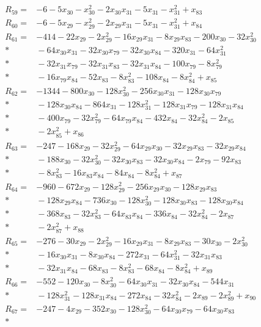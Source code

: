 \begin{align*}
R_{59}={}&-6-5x_{30}-x_{30}^{2}-2x_{30}x_{31}-5x_{31}-x_{31}^{2}+x_{83}\\[3pt]
R_{60}={}&-6-5x_{29}-x_{29}^{2}-2x_{29}x_{31}-5x_{31}-x_{31}^{2}+x_{84}\\[3pt]
R_{61}={}&-414-22x_{29}-2x_{29}^{2}-16x_{29}x_{31}-8x_{29}x_{83}-200x_{30}-32x_{30}^{2}\\*
&{}-64x_{30}x_{31}-32x_{30}x_{79}-32x_{30}x_{84}-320x_{31}-64x_{31}^{2}\\*
&{}-32x_{31}x_{79}-32x_{31}x_{83}-32x_{31}x_{84}-100x_{79}-8x_{79}^{2}\\*
&{}-16x_{79}x_{84}-52x_{83}-8x_{83}^{2}-108x_{84}-8x_{84}^{2}+x_{85}\\[3pt]
R_{62}={}&-1344-800x_{30}-128x_{30}^{2}-256x_{30}x_{31}-128x_{30}x_{79}\\*
&{}-128x_{30}x_{84}-864x_{31}-128x_{31}^{2}-128x_{31}x_{79}-128x_{31}x_{84}\\*
&{}-400x_{79}-32x_{79}^{2}-64x_{79}x_{84}-432x_{84}-32x_{84}^{2}-2x_{85}\\*
&{}-2x_{85}^{2}+x_{86}\\[3pt]
R_{63}={}&-247-168x_{29}-32x_{29}^{2}-64x_{29}x_{30}-32x_{29}x_{83}-32x_{29}x_{84}\\*
&{}-188x_{30}-32x_{30}^{2}-32x_{30}x_{83}-32x_{30}x_{84}-2x_{79}-92x_{83}\\*
&{}-8x_{83}^{2}-16x_{83}x_{84}-84x_{84}-8x_{84}^{2}+x_{87}\\[3pt]
R_{64}={}&-960-672x_{29}-128x_{29}^{2}-256x_{29}x_{30}-128x_{29}x_{83}\\*
&{}-128x_{29}x_{84}-736x_{30}-128x_{30}^{2}-128x_{30}x_{83}-128x_{30}x_{84}\\*
&{}-368x_{83}-32x_{83}^{2}-64x_{83}x_{84}-336x_{84}-32x_{84}^{2}-2x_{87}\\*
&{}-2x_{87}^{2}+x_{88}\\[3pt]
R_{65}={}&-276-30x_{29}-2x_{29}^{2}-16x_{29}x_{31}-8x_{29}x_{83}-30x_{30}-2x_{30}^{2}\\*
&{}-16x_{30}x_{31}-8x_{30}x_{84}-272x_{31}-64x_{31}^{2}-32x_{31}x_{83}\\*
&{}-32x_{31}x_{84}-68x_{83}-8x_{83}^{2}-68x_{84}-8x_{84}^{2}+x_{89}\\[3pt]
R_{66}={}&-552-120x_{30}-8x_{30}^{2}-64x_{30}x_{31}-32x_{30}x_{84}-544x_{31}\\*
&{}-128x_{31}^{2}-128x_{31}x_{84}-272x_{84}-32x_{84}^{2}-2x_{89}-2x_{89}^{2}+x_{90}\\[3pt]
R_{67}={}&-247-4x_{29}-352x_{30}-128x_{30}^{2}-64x_{30}x_{79}-64x_{30}x_{83}\\*

\end{align*}
